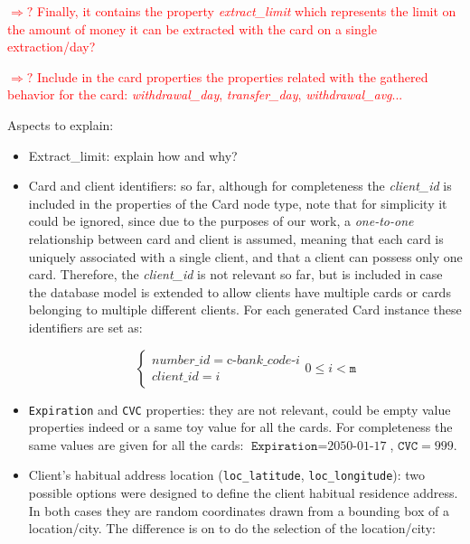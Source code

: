 \documentclass{article}
\begin{document}
\textcolor{red}{$\Rightarrow ?$ Finally, it contains the property \emph{extract\_limit}
which represents the limit on the amount of money it can be extracted with the card on a single 
extraction/day?}

\textcolor{red}{$\Rightarrow ?$ Include in the card properties the properties related with the
gathered behavior for the card: \emph{withdrawal\_day}, \emph{transfer\_day}, 
\emph{withdrawal\_avg}...}

\begin{tcolorbox}
  Aspects to explain:
  \begin{itemize}
    \item Extract\_limit: explain how and why?
  \end{itemize}
\end{tcolorbox}

\begin{itemize}
\item Card and client identifiers:
so far, although for completeness the \emph{client\_id} is included in the properties of the Card node type, note that for simplicity it could be ignored, since due to the purposes of our work, a \emph{one-to-one} relationship between card and client 
is assumed, meaning that each card is uniquely associated with a single client, and that a client
can possess only one card. Therefore, the \emph{client\_id} is not relevant so far, but is included
in case the database model is extended to allow clients have multiple cards or cards belonging to 
multiple different clients. For each generated Card instance these identifiers are set as:

\[
\begin{cases} 
number\_id = \text{c-}bank\_code\text{-}i \\
client\_id = i 
\end{cases}
0 \leq i < \texttt{m}
\]

\item \texttt{Expiration} and \texttt{CVC} properties: they are not relevant, could be empty 
  value properties indeed or a same toy value for all the cards. For completeness the  
  same values are given for all the cards: $\texttt{Expiration} = \text{2050-01-17}$, $\texttt{CVC} = 999$.

\item Client's habitual address location (\texttt{loc\_latitude}, \texttt{loc\_longitude}): two possible options were designed to define the client habitual residence address. In both 
cases they are random 
coordinates drawn from a bounding box of a location/city. The difference is on to do the selection of the location/city:


\end{itemize}
\end{document}
